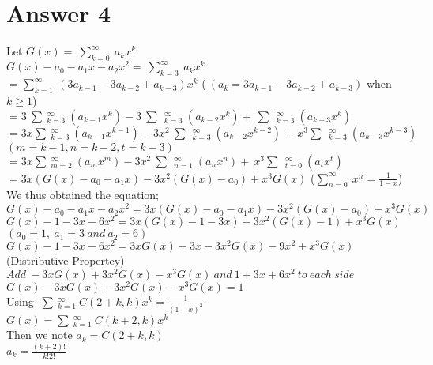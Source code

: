 \documentclass[11pt]{article}
\begin{document}
\newpage
\section*{Answer 4}
Let $G\left(x\right)=\:\sum _{k=0}^{\infty }\:a_kx^k$ \\
$G\left(x\right)-a_0-a_1x-a_2x^2=\:\sum _{k=3}^{\infty }\:a_kx^k$ \\
$=\sum _{k=1}^{\infty }\:\left(3a_{k-1}-3a_{k-2}+a_{k-3}\right)x^k$ ($\:\left(a_k=3a_{k-1}-3a_{k-2}+a_{k-3}\right)$ when $k\ge1$) \\
$=3\:\sum \:_{k=3}^{\infty \:}\:\left(a_{k-1}x^k\right)-3\:\sum \:\:_{k=3}^{\infty \:\:}\:\left(a_{k-2}x^k\right)+\:\sum \:\:_{k=3}^{\infty \:\:}\:\left(a_{k-3}x^k\right)$ \\
$=3x\sum \:_{k=3}^{\infty \:}\:\left(a_{k-1}x^{k-1}\right)-3x^2\:\sum \:\:_{k=3}^{\infty \:\:}\:\left(a_{k-2}x^{k-2}\right)+\:x^3\sum \:\:_{k=3}^{\infty \:\:}\:\left(a_{k-3}x^{k-3}\right)$ \\
$(m=k-1,n=k-2, t=k-3)$ \\
$=3x\sum \:_{m=2}^{\infty \:}\:\left(a_mx^m\right)-3x^2\:\sum \:\:_{n=1}^{\infty \:\:}\:\left(a_nx^n\right)+\:x^3\sum \:\:_{t=0}^{\infty \:\:}\:\left(a_tx^t\right)$ \\
$=3x\left(G\left(x\right)-a_0-a_1x\right)-3x^2\left(G\left(x\right)-a_0\right)+x^3G\left(x\right)$  ($\sum _{n=0}^{\infty }\:x^n=\frac{1}{1-x}$) \\
We thus obtained the equation; \\
$G\left(x\right)-a_0-a_1x-a_2x^2=3x\left(G\left(x\right)-a_0-a_1x\right)-3x^2\left(G\left(x\right)-a_0\right)+x^3G\left(x\right)$ \\
$G\left(x\right)-1-3x-6x^2=3x\left(G\left(x\right)-1-3x\right)-3x^2\left(G\left(x\right)-1\right)+x^3G\left(x\right)$ $(a_0=1,\:a_1=3\:and\:a_2=6)$ \\
$G\left(x\right)-1-3x-6x^2=3xG\left(x\right)-3x-3x^2G\left(x\right)-9x^2+x^3G\left(x\right)$ (Distributive Propertey) \\
$Add\:-3xG\left(x\right)+3x^2G\left(x\right)-x^3G\left(x\right)\:and\:1+3x+6x^2\:to\:each\:side$ \\
$G\left(x\right)-3xG\left(x\right)+3x^2G\left(x\right)-x^3G\left(x\right)=1$ \\

Using $\:\sum \:_{k=1}^{\infty \:}\:C\left(2+k,k\right)x^k=\frac{1}{\left(1-x\right)^3}$ \\
$G\left(x\right)= \sum \:_{k=1}^{\infty \:}\:C\left(k+2,k\right)x^k$ \\
Then we note $a_k=C\left(2+k,k\right)$ \\
$a_k=\frac{\left(k+2\right)!}{k!2!}$ \\
\end{document}
